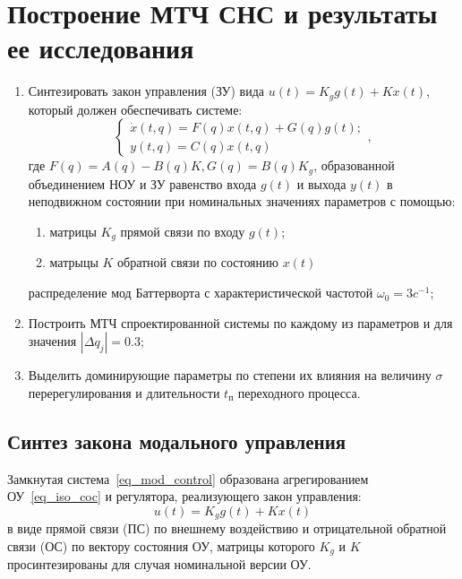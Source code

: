\section{Построение МТЧ СНС и результаты ее исследования}

\begin{enumerate}
	\item Синтезировать закон управления (ЗУ) вида $u(t) = K_g g(t) + K x(t)$, который должен обеспечивать системе:
	\begin{equation}\label{eq_mod_control}
		\begin{cases}
			\dot x(t, q) = F(q) x(t,q) + G(q) g(t);\\
			y(t, q) = C(q) x(t,q)
		\end{cases},
	\end{equation} 
	где $F(q) = A(q) - B(q) K, G(q) = B(q) K_g$,
	образованной объединением НОУ и ЗУ равенство входа $g(t)$ и выхода $y(t)$ в неподвижном состоянии при номинальных значениях параметров с помощью:
	\begin{enumerate}
		\item матрицы $K_g$ прямой связи по входу $g(t)$;
		\item матрыцы $K$ обратной связи по состоянию $x(t)$
	\end{enumerate}
	распределение мод Баттерворта с характеристической частотой $\omega_0 = 3 c^{-1}$;
	\item Построить МТЧ спроектированной системы по каждому из параметров и для значения $|\Delta q_j| = 0.3$;
	\item Выделить доминирующие параметры по степени их влияния на величину $\sigma$ перерегулирования и длительности $t_\text{п}$ переходного процесса.
\end{enumerate}

\subsection{Синтез закона модального управления}


Замкнутая система~\ref{eq_mod_control} образована агрегированием ОУ~\ref{eq_iso_coc} и регулятора, реализующего закон управления:
\begin{equation}\label{reg}
	u(t) = K_g g(t) + K x(t)
\end{equation}
в виде прямой связи (ПС) по внешнему воздействию и отрицательной обратной связи (ОС) по вектору состояния ОУ, матрицы которого $K_g$ и $K$ просинтезированы для случая номинальной версии ОУ.

